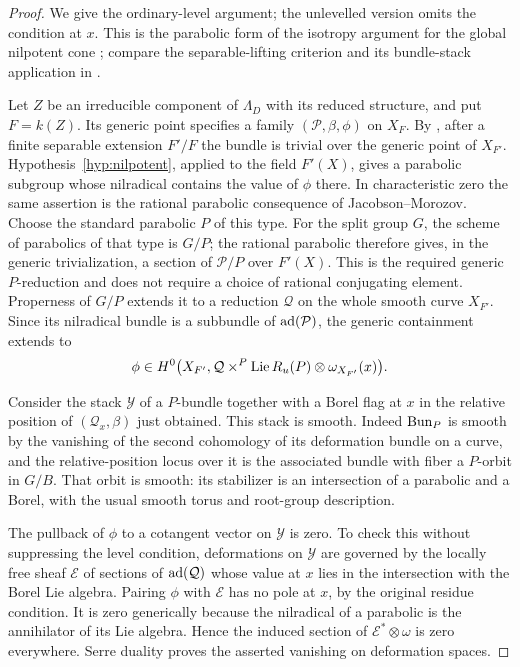 \begin{proof}
We give the ordinary-level argument; the unlevelled version omits the
condition at $x$.  This is the parabolic form of the isotropy argument
for the global nilpotent cone \cite[Lemma~7]{GinzburgNilpotent}; compare the
separable-lifting criterion and its bundle-stack application in
\cite[Appendix~D.1.5 and D.1.8]{AGKRRV}.

Let $Z$ be an irreducible component of $\Lambda_D$ with its reduced
structure, and put $F=k(Z)$.  Its generic point specifies a family
$(\mathcal P,\beta,\phi)$ on $X_F$.  By
\cite[Theorem~2]{DrinfeldSimpson}, after a finite separable extension
$F'/F$ the bundle is trivial over the generic point of $X_{F'}$.
Hypothesis~\ref{hyp:nilpotent}, applied to the field $F'(X)$, gives a parabolic subgroup
whose nilradical contains the value of $\phi$ there.  In characteristic
zero the same assertion is the rational parabolic consequence of
Jacobson--Morozov.  Choose the standard parabolic $P$ of this type.
For the split group $G$, the scheme of parabolics of that type is
$G/P$; the rational parabolic therefore gives, in the generic
trivialization, a section of $\mathcal P/P$ over $F'(X)$.
This is the required generic $P$-reduction and does not require a
choice of rational conjugating element.  Properness of $G/P$ extends it to a reduction
$\mathcal Q$ on the whole smooth curve $X_{F'}$.  Since its nilradical
bundle is a subbundle of $\operatorname{ad}(\mathcal P)$, the generic containment
extends to
\[
 \phi\in H^0\bigl(X_{F'},
          \mathcal Q\mathbin{\times}^{P}\operatorname{Lie} R_u(P)
                     \otimes\omega_{X_{F'}}(x)\bigr).
\]

Consider the stack $\mathcal Y$ of a $P$-bundle together with a Borel
flag at $x$ in the relative position of $(\mathcal Q_x,\beta)$ just
obtained.  This stack is smooth.  Indeed $\operatorname{Bun}_P$ is smooth by the
vanishing of the second cohomology of its deformation bundle on a
curve, and the relative-position locus over it is the associated
bundle with fiber a $P$-orbit in $G/B$.  That orbit is smooth: its
stabilizer is an intersection of a parabolic and a Borel, with the
usual smooth torus and root-group description.

The pullback of $\phi$ to a cotangent vector on $\mathcal Y$ is zero.
To check this without suppressing the level condition, deformations
on $\mathcal Y$ are governed by the locally free sheaf $\mathcal E$
of sections of $\operatorname{ad}(\mathcal Q)$ whose value at $x$ lies in the
intersection with the Borel Lie algebra.  Pairing $\phi$ with
$\mathcal E$ has no pole at $x$, by the original residue condition.
It is zero generically because the nilradical of a parabolic is the
annihilator of its Lie algebra.  Hence the induced section of
$\mathcal E^*\otimes\omega$ is zero everywhere.  Serre duality proves
the asserted vanishing on deformation spaces.


\end{proof}
